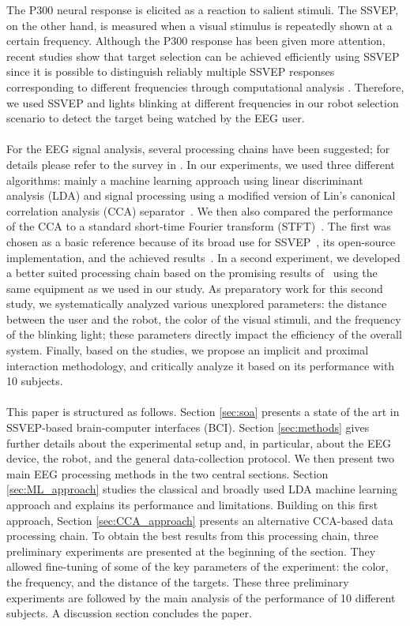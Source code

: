 \documentclass[smallextended]{svjour3}
\begin{document}
The P300 neural response is elicited as a reaction to salient stimuli. 
The SSVEP, on the other hand, is measured when a visual stimulus is repeatedly shown at a certain frequency. Although the P300 response has been given more attention, recent studies show that target selection can be achieved efficiently using SSVEP since it is possible to distinguish reliably multiple SSVEP responses corresponding to different frequencies through computational analysis \cite{SSVEPfiability}.
Therefore, we used SSVEP and lights blinking at different frequencies in our robot selection scenario to detect the target being watched by the EEG user. \\ 
\\ 
For the EEG signal analysis, several processing chains have been suggested; for details please refer to the survey in \cite{Bi2013}. In our experiments, we used three different algorithms: mainly a machine learning approach using linear discriminant analysis (LDA) and signal processing using a modified version of Lin's canonical correlation analysis (CCA) separator~\cite{Lin2014}.
We then also compared the performance of the CCA to a standard short-time Fourier transform (STFT)~\cite{Durak2003}.
The first was chosen as a basic reference because of its broad use for SSVEP~\cite{Bi2013}, its open-source implementation, and the achieved results~\cite{openvibeSSVEP}. In a second experiment, we developed a better suited processing chain based on the promising results of~\cite{Lin2014} using the same equipment as we used in our study.
As preparatory work for this second study, we systematically analyzed various unexplored parameters: the distance between the user and the robot, the color of the visual stimuli, and the frequency of the blinking light; these parameters directly impact the efficiency of the overall system. 
Finally, based on the studies, we propose an implicit and proximal interaction methodology, and critically analyze it based on its performance with 10 subjects.\\
\\
This paper is structured as follows. Section \ref{sec:soa} presents a state of the art in SSVEP-based brain-computer interfaces (BCI). Section \ref{sec:methods} gives further details about the experimental setup and, in particular, about the EEG device, the robot, and the general data-collection protocol. 
We then present two main EEG processing methods in the two central sections. Section \ref{sec:ML_approach} studies the classical and broadly used LDA machine learning approach and explains its performance and limitations. Building on this first approach, Section \ref{sec:CCA_approach} presents an alternative CCA-based data processing chain.
To obtain the best results from this processing chain, three preliminary experiments are presented at the beginning of the section.
They allowed fine-tuning of some of the key parameters of the experiment: the color, the frequency, and the distance of the targets. These three preliminary experiments are followed by the main analysis of the performance of 10 different subjects. A discussion section concludes the paper.
\end{document}
